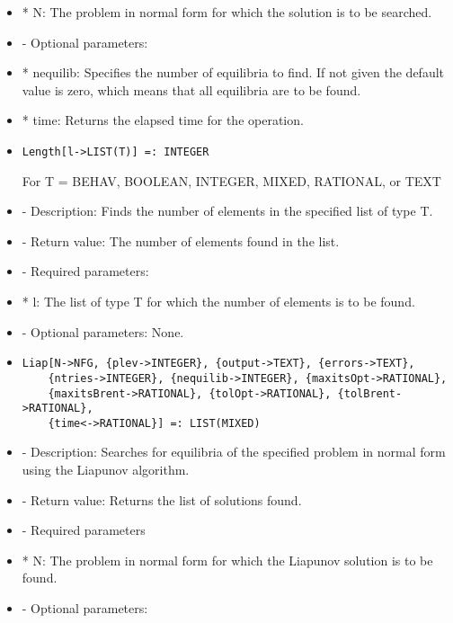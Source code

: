 \begin{itemize}
\bd
\item
*  N:  The problem in normal form for which the solution is to be 
searched.
\ed

\item
- Optional parameters: 

\bd
\item
*  nequilib:  Specifies the number of equilibria to find.  If not
given the default value is zero, which means that all 
equilibria are to be found.
\item
*  time:  Returns the elapsed time for the operation.
\ed
\ed

\item
\begin{verbatim}
Length[l->LIST(T)] =: INTEGER
\end{verbatim}
	For T = BEHAV, BOOLEAN, INTEGER, MIXED, RATIONAL, or TEXT

\bd
\item
- Description:  Finds the number of elements in the specified list of 
type T.
\item
- Return value:  The number of elements found in the list.
\item
- Required parameters:

\bd
\item
*  l:  The list of type T for which the number of elements is to be found.
\ed

\item
- Optional parameters:  None.
\ed

\item
\begin{verbatim}
Liap[N->NFG, {plev->INTEGER}, {output->TEXT}, {errors->TEXT}, 
	{ntries->INTEGER}, {nequilib->INTEGER}, {maxitsOpt->RATIONAL},
	{maxitsBrent->RATIONAL}, {tolOpt->RATIONAL}, {tolBrent->RATIONAL},
	{time<->RATIONAL}] =: LIST(MIXED)
\end{verbatim}

\bd
\item
- Description:  Searches for equilibria of the specified problem in 
normal form using the Liapunov algorithm.
\item
- Return value:  Returns the list of solutions found.
\item
- Required parameters

\bd
\item
*  N:  The problem in normal form for which the Liapunov solution is 
to be found.
\ed

\item
- Optional parameters:


\end{itemize}
